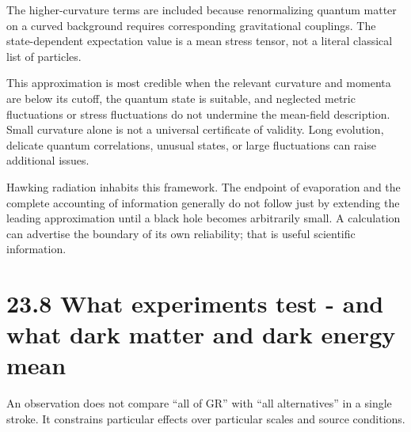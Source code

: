 \documentclass[
  11pt,
  letterpaper,
  oneside,
  openany]{scrbook}
\begin{document}
The higher-curvature terms are included because renormalizing quantum
matter on a curved background requires corresponding gravitational
couplings. The state-dependent expectation value is a mean stress
tensor, not a literal classical list of particles.

This approximation is most credible when the relevant curvature and
momenta are below its cutoff, the quantum state is suitable, and
neglected metric fluctuations or stress fluctuations do not undermine
the mean-field description. Small curvature alone is not a universal
certificate of validity. Long evolution, delicate quantum correlations,
unusual states, or large fluctuations can raise additional issues.

Hawking radiation inhabits this framework. The endpoint of evaporation
and the complete accounting of information generally do not follow just
by extending the leading approximation until a black hole becomes
arbitrarily small. A calculation can advertise the boundary of its own
reliability; that is useful scientific information.

\hypertarget{what-experiments-test---and-what-dark-matter-and-dark-energy-mean}{%
\section{23.8 What experiments test - and what dark matter and dark
energy
mean}\label{what-experiments-test---and-what-dark-matter-and-dark-energy-mean}}

An observation does not compare ``all of GR'' with ``all alternatives''
in a single stroke. It constrains particular effects over particular
scales and source conditions.

\begingroup\small\setlength{\tabcolsep}{5pt}\renewcommand{\arraystretch}{1.13}
\end{document}
